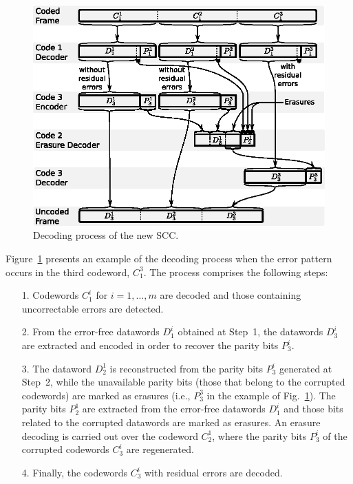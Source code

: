 \documentclass[conference]{IEEEtran}
\newcommand{\ScaleA}{1.0} %
\begin{document}
\begin{figure}[t]
  \centerline{\includegraphics[width=\ScaleA\columnwidth]{figures_sources/drawing_v10_proposed_1_decoder.eps}}%
  \caption{Decoding process of the new SCC.}
    \label{fig:pro1dec} 
\end{figure}

Figure~\ref{fig:pro1dec} presents an example of the decoding process
when the error pattern occurs in the third codeword, $C_1^3$. The
process comprises the following steps:
\begin{itemize}
\item[1.] Codewords $C^i_1$ for $i=1,\ldots,m$ are decoded and those
  containing uncorrectable errors are detected.
\item[2.] From the error-free datawords $D_1^i$ obtained at Step~1,
  the datawords $D_3^i$ are extracted and encoded in order to recover
  the parity bits $P_3^i$.
\item[3.] The dataword $D^1_2$ is reconstructed from the parity bits
  $P_3^i$ generated at Step~2, while the unavailable parity bits
  (those that belong to the corrupted codewords) are marked as
  erasures (i.e., $P^3_3$ in the example of
  Fig.~\ref{fig:pro1dec}). The parity bits $P^1_2$ are extracted from
  the error-free datawords $D^i_1$ and those bits related to the
  corrupted datawords are marked as erasures. An erasure decoding is
  carried out over the codeword $C^1_2$, where the parity bits $P^i_3$
  of the corrupted codewords $C^i_3$ are regenerated.
\item[4.] Finally, the codewords $C^i_3$ with residual errors are
  decoded.
\end{itemize}
\end{document}
